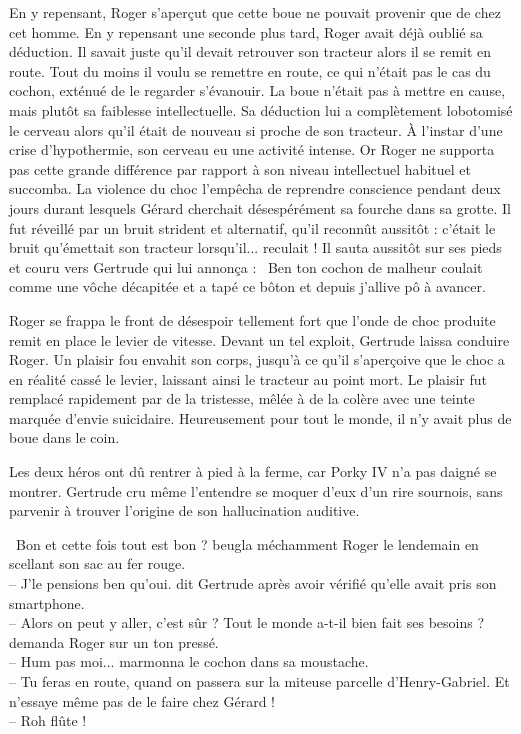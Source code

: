\documentclass[a5paper, 10pt, twoside]{book}
\newcommand{\cg}{\guillemotleft~}
\newcommand{\cd}{~\guillemotright}
\begin{document}
En y repensant, Roger s'aperçut que cette boue ne pouvait provenir que de chez cet homme. En y repensant une seconde plus tard, Roger avait déjà oublié sa déduction. Il savait juste qu'il devait retrouver son tracteur alors il se remit en route. Tout du moins il voulu se remettre en route, ce qui n'était pas le cas du cochon, exténué de le regarder s'évanouir. La boue n'était pas à mettre en cause, mais plutôt sa faiblesse intellectuelle. Sa déduction lui a complètement lobotomisé le cerveau alors qu'il était de nouveau si proche de son tracteur. À l'instar d'une crise d'hypothermie, son cerveau eu une activité intense. Or Roger ne supporta pas cette grande différence par rapport à son niveau intellectuel habituel et succomba. La violence du choc l'empêcha de reprendre conscience pendant deux jours durant lesquels Gérard cherchait désespérément sa fourche dans sa grotte. Il fut réveillé par un bruit strident et alternatif, qu'il reconnût aussitôt : c'était le bruit qu'émettait son tracteur lorsqu'il... reculait ! Il sauta aussitôt sur ses pieds et couru vers Gertrude qui lui annonça : \cg Ben ton cochon de malheur coulait comme une vôche décapitée et a tapé ce bôton et depuis j'allive pô à avancer.\cd

Roger se frappa le front de désespoir tellement fort que l'onde de choc produite remit en place le levier de vitesse. Devant un tel exploit, Gertrude laissa conduire Roger. Un plaisir fou envahit son corps, jusqu'à ce qu'il s'aperçoive que le choc a en réalité cassé le levier, laissant ainsi le tracteur au point mort. Le plaisir fut remplacé rapidement par de la tristesse, mêlée à de la colère avec une teinte marquée d'envie suicidaire. Heureusement pour tout le monde, il n'y avait plus de boue dans le coin.

Les deux héros ont dû rentrer à pied à la ferme, car Porky IV n'a pas daigné se montrer. Gertrude cru même l'entendre se moquer d'eux d'un rire sournois, sans parvenir à trouver l'origine de son hallucination auditive.



\cg Bon et cette fois tout est bon ? beugla méchamment Roger le lendemain en scellant son sac au fer rouge.\\
-- J'le pensions ben qu'oui. dit Gertrude après avoir vérifié qu'elle avait pris son smartphone.\\
-- Alors on peut y aller, c'est sûr ? Tout le monde a-t-il bien fait ses besoins ? demanda Roger sur un ton pressé.\\
-- {\tiny Hum pas moi}... marmonna le cochon dans sa moustache.\\
-- Tu feras en route, quand on passera sur la miteuse parcelle d'Henry-Gabriel. Et n'essaye même pas de le faire chez Gérard !\\
-- Roh flûte !\cd
\end{document}
